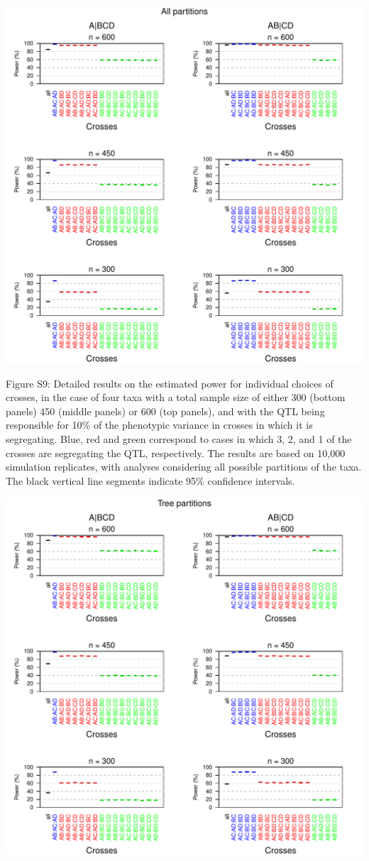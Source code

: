 \documentclass[letterpaper,twoside]{article}
\begin{document}
{\centering
\includegraphics{SuppFigs/detailedpower_allpart.pdf}}

\bigskip \noindent
Figure S9: Detailed results on the estimated power
  for individual choices of crosses, in the case of four taxa
  with a total sample size of either 300 (bottom panels)
  450 (middle panels) or 600 (top panels),
  and with the QTL being responsible
  for 10\% of the phenotypic variance in crosses in which it is
  segregating. Blue, red and green correspond to cases in which 3, 2,
  and 1 of the crosses are segregating the QTL, respectively.  The
  results are based on 10,000 simulation replicates, with analyses
  considering all possible partitions of the taxa.  The black vertical
  line segments indicate 95\% confidence
  intervals.

\newpage

{\centering
\includegraphics{SuppFigs/detailedpower_treepart.pdf}}
\end{document}
